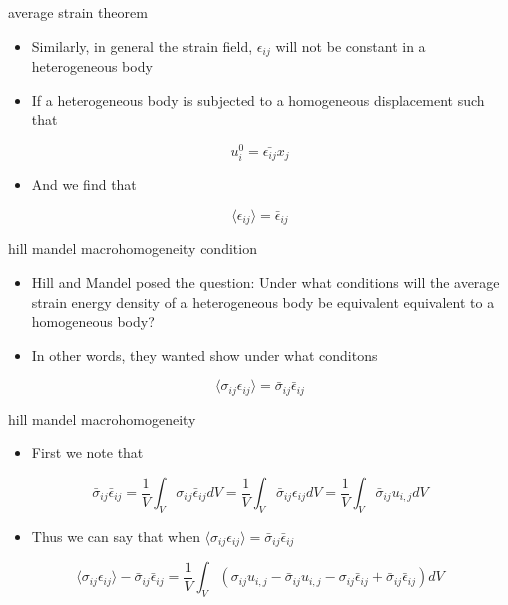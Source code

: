 \documentclass[
  letterpaper,
  ignorenonframetext,
  aspectratio=43,
  handout,
  12pt]{beamer}
\providecommand{\tightlist}{%
  \setlength{\itemsep}{0pt}\setlength{\parskip}{0pt}}
\providecommand{\tightlist}{%
\setlength{\itemsep}{0pt}\setlength{\parskip}{0pt}}
\begin{document}
\begin{frame}{average strain theorem}
\protect\hypertarget{average-strain-theorem}{}
\begin{itemize}
\tightlist
\item
  Similarly, in general the strain field, \(\epsilon_{ij}\) will not be
  constant in a heterogeneous body
\item
  If a heterogeneous body is subjected to a homogeneous displacement
  such that
\end{itemize}

\[u_i^0 = \bar{\epsilon_{ij}}x_j\]

\begin{itemize}
\tightlist
\item
  And we find that
\end{itemize}

\[\langle \epsilon_{ij} \rangle = \bar{\epsilon}_{ij}\]
\end{frame}

\begin{frame}{hill mandel macrohomogeneity condition}
\protect\hypertarget{hill-mandel-macrohomogeneity-condition}{}
\begin{itemize}
\tightlist
\item
  Hill and Mandel posed the question: Under what conditions will the
  average strain energy density of a heterogeneous body be equivalent
  equivalent to a homogeneous body?
\item
  In other words, they wanted show under what conditons
\end{itemize}

\[\langle \sigma_{ij} \epsilon_{ij} \rangle = \bar{\sigma}_{ij} \bar{\epsilon}_{ij}\]
\end{frame}

\begin{frame}{hill mandel macrohomogeneity}
\protect\hypertarget{hill-mandel-macrohomogeneity}{}
\begin{itemize}
\tightlist
\item
  First we note that
\end{itemize}

\[\bar{\sigma}_{ij} \bar{\epsilon}_{ij} = \frac{1}{V} \int_V \sigma_{ij} \bar{\epsilon}_{ij} dV = \frac{1}{V} \int_V \bar{\sigma}_{ij} \epsilon_{ij} dV = \frac{1}{V} \int_V \bar{\sigma}_{ij} u_{i,j} dV\]

\begin{itemize}
\tightlist
\item
  Thus we can say that when
  \(\langle \sigma_{ij} \epsilon_{ij} \rangle = \bar{\sigma}_{ij} \bar{\epsilon}_{ij}\)
\end{itemize}

\[\langle \sigma_{ij} \epsilon_{ij} \rangle - \bar{\sigma}_{ij} \bar{\epsilon}_{ij} = \frac{1}{V} \int_V (\sigma_{ij}u_{i,j} - \bar{\sigma}_{ij} u_{i,j} - \sigma_{ij}\bar{\epsilon}_{ij}+\bar{\sigma}_{ij} \bar{\epsilon}_{ij})dV\]
\end{frame}
\end{document}

